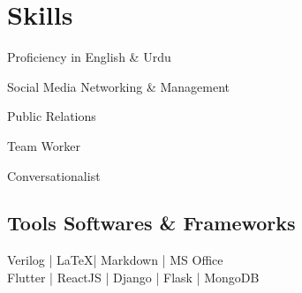 \documentclass[]{resume}
\begin{document}
\begin{minipage}[t]{0.59\textwidth}
    \sectionsep
    
    


\section{Skills}
\begin{multicols}{2}
\begin{tightemize}
        \item Proficiency in English \& Urdu
        \item Social Media Networking \& Management
        \item Public Relations
        \columnbreak
        \item Team Worker
        \item Conversationalist
    \end{tightemize}
\end{multicols}

\subsection{Tools Softwares \& Frameworks}
Verilog | \LaTeX | Markdown | MS Office\\ 
Flutter | ReactJS | Django | Flask | MongoDB

%
%

\end{minipage} 
\hfill
\end{document}
